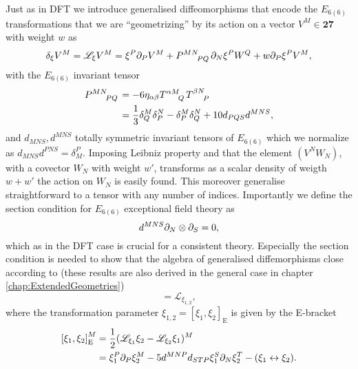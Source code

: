 Just as in DFT we introduce generalised diffeomorphisms that encode the $E_{6(6)}$ transformations that we are ``geometrizing'' by its action on a vector $V^M\in\mathbf{27}$ with weight $w$ as 
\begin{equation}
    \delta_\xi V^M = \mathscr{L}_\xi V^M = \xi^P\pd_PV^M+\tensor{P}{^{MN}_{PQ}}\pd_N\xi^P W^Q+w\pd_P\xi^PV^M,
\end{equation}
with the $E_{6(6)}$ invariant tensor
\begin{equation}
    \begin{aligned}
    \tensor{P}{^{MN}_{PQ}} &= -6\eta_{\alpha\beta}\tensor{T}{^{\alpha M}_Q}\tensor{T}{^{\beta N}_P} \\
    &= \frac{1}{3}\delta^M_Q\delta^N_P-\delta^M_P\delta^N_Q+10d_{PQS}d^{MNS},
    \end{aligned}
\end{equation}
and $d_{MNS},d^{MNS}$ totally symmetric invariant tensors of $E_{6(6)}$ which we normalize as $d_{MNS}d^{PNS}=\delta^P_M$. Imposing Leibniz property and that the element $(V^NW_N)$, with a covector $W_N$ with weight $w'$, transforms as a scalar density of weigth $w+w'$ the action on $W_N$ is easily found. This moreover generalise straightforward to a tensor with any number of indices. Importantly we define the section condition for $E_{6(6)}$ exceptional field theory as 
\begin{equation}
    d^{MNS}\partial_N\otimes\partial_S = 0,
\end{equation}
which as in the DFT case is crucial for a consistent theory. Especially the section condition is needed to show that the algebra of generalised diffemorphisms close according to \cite{E62014} (these results are also derived in the general case in chapter \ref{chap:ExtendedGeometries})
\begin{equation}
    [\mathscr{L}_{\xi_1},\mathscr{L}_{\xi_2}] = \mathscr{L}_{\xi_{1,2}},
\end{equation}
where the transformation parameter $\xi_{1,2}=[\xi_1,\xi_2]_{\text{E}}$ is given by the E-bracket 
\begin{equation}\begin{aligned}
    \left[\xi_1,\xi_2\right]_{\text{E}}^M &= \frac{1}{2}(\mathscr{L}_{\xi_1}\xi_2-\mathscr{L}_{\xi_2}\xi_1)^M\\ &=\xi_1^P\partial_P\xi_2^M-5d^{MNP}d_{STP}\xi_1^S\partial_N\xi_2^T-(\xi_1\leftrightarrow\xi_2).
    \end{aligned}
\end{equation}

